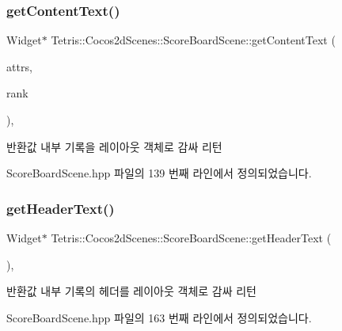 \subsubsection{\texorpdfstring{get\+Content\+Text()}{getContentText()}}
{\footnotesize\ttfamily Widget$\ast$ Tetris\+::\+Cocos2d\+Scenes\+::\+Score\+Board\+Scene\+::get\+Content\+Text (\begin{DoxyParamCaption}\item[{struct \hyperlink{struct_tetris_1_1_d_b_management_1_1_score_board_attributes}{Score\+Board\+Attributes} $\ast$}]{attrs,  }\item[{int}]{rank }\end{DoxyParamCaption})\hspace{0.3cm}{\ttfamily [inline]}, {\ttfamily [protected]}}

\begin{DoxyReturn}{반환값}
내부 기록을 레이아웃 객체로 감싸 리턴 
\end{DoxyReturn}


Score\+Board\+Scene.\+hpp 파일의 139 번째 라인에서 정의되었습니다.

\mbox{\label{class_tetris_1_1_cocos2d_scenes_1_1_score_board_scene_a89a944c51155ffa16474e406a1103753}} 
\subsubsection{\texorpdfstring{get\+Header\+Text()}{getHeaderText()}}
{\footnotesize\ttfamily Widget$\ast$ Tetris\+::\+Cocos2d\+Scenes\+::\+Score\+Board\+Scene\+::get\+Header\+Text (\begin{DoxyParamCaption}{ }\end{DoxyParamCaption})\hspace{0.3cm}{\ttfamily [inline]}, {\ttfamily [protected]}}

\begin{DoxyReturn}{반환값}
내부 기록의 헤더를 레이아웃 객체로 감싸 리턴 
\end{DoxyReturn}


Score\+Board\+Scene.\+hpp 파일의 163 번째 라인에서 정의되었습니다.


